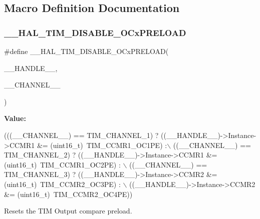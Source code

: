 \subsection{Macro Definition Documentation}
\mbox{\label{group___t_i_m_ex_ga3e0ec4eb797b54c408a3be067f41a2f8}} 
\subsubsection{\texorpdfstring{\+\_\+\+\_\+\+H\+A\+L\+\_\+\+T\+I\+M\+\_\+\+D\+I\+S\+A\+B\+L\+E\+\_\+\+O\+Cx\+P\+R\+E\+L\+O\+AD}{\_\_HAL\_TIM\_DISABLE\_OCxPRELOAD}}
{\footnotesize\ttfamily \#define \+\_\+\+\_\+\+H\+A\+L\+\_\+\+T\+I\+M\+\_\+\+D\+I\+S\+A\+B\+L\+E\+\_\+\+O\+Cx\+P\+R\+E\+L\+O\+AD(\begin{DoxyParamCaption}\item[{}]{\+\_\+\+\_\+\+H\+A\+N\+D\+L\+E\+\_\+\+\_\+,  }\item[{}]{\+\_\+\+\_\+\+C\+H\+A\+N\+N\+E\+L\+\_\+\+\_\+ }\end{DoxyParamCaption})}

{\bfseries Value\+:}
\begin{DoxyCode}
(((\_\_CHANNEL\_\_) == TIM\_CHANNEL\_1) ? ((\_\_HANDLE\_\_)->Instance->CCMR1 &= (uint16\_t)~TIM\_CCMR1\_OC1PE) :\(\backslash\)
         ((\_\_CHANNEL\_\_) == TIM\_CHANNEL\_2) ? ((\_\_HANDLE\_\_)->Instance->CCMR1 &= (uint16\_t)~TIM\_CCMR1\_OC2PE) :
      \(\backslash\)
         ((\_\_CHANNEL\_\_) == TIM\_CHANNEL\_3) ? ((\_\_HANDLE\_\_)->Instance->CCMR2 &= (uint16\_t)~TIM\_CCMR2\_OC3PE) :
      \(\backslash\)
         ((\_\_HANDLE\_\_)->Instance->CCMR2 &= (uint16\_t)~TIM\_CCMR2\_OC4PE))
\end{DoxyCode}


Resets the T\+IM Output compare preload. 


